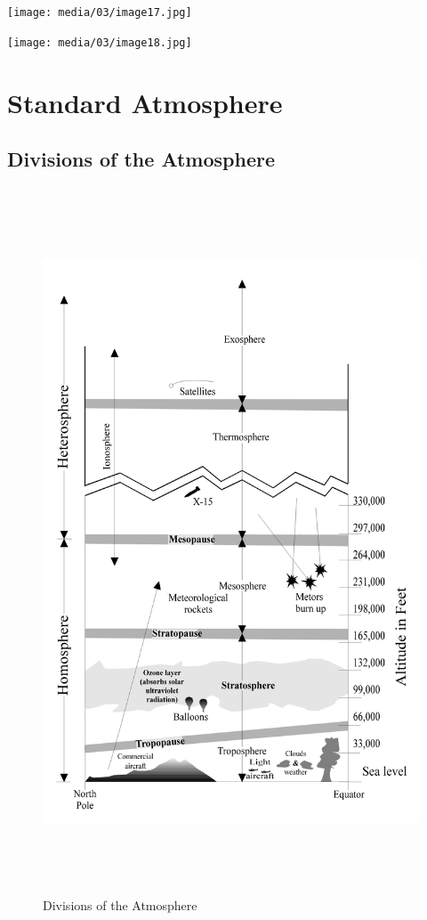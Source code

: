 \documentclass[
]{book}
\begin{document}
\texttt{[image: media/03/image17.jpg]}

\texttt{[image: media/03/image18.jpg]}

\hypertarget{standard-atmosphere}{%
\section{Standard Atmosphere}\label{standard-atmosphere}}

\hypertarget{divisions-of-the-atmosphere}{%
\subsection*{Divisions of the Atmosphere}\label{divisions-of-the-atmosphere}}

\begin{figure}
\centering
\includegraphics[width=7in,height=8.25in]{media/03/image19.png}
\caption{Divisions of the Atmosphere}
\end{figure}
\end{document}
